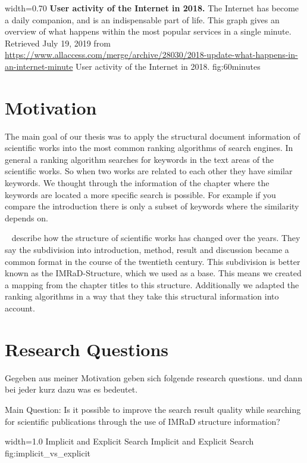       {width=0.70\textwidth}
      {\textbf{User activity of the Internet in 2018.} The Internet has become a daily companion, and is an indispensable part of life. This graph gives an overview of what happens within the most popular services in a single minute. Retrieved July 19, 2019 from \url{https://www.allaccess.com/merge/archive/28030/2018-update-what-happens-in-an-internet-minute}}
      {User activity of the Internet in 2018.}
      {fig:60minutes}

\section{Motivation}
\label{sec:Motivation}

The main goal of our thesis was to apply the structural document information of scientific works into the most common ranking algorithms of search engines. In general a ranking algorithm searches for keywords in the text areas of the scientific works. So when two works are related to each other they have similar keywords. We thought through the information of the chapter where the keywords are located a more specific search is possible. For example if you compare the introduction there is only a subset of keywords where the similarity depends on.

 ~\cite{Sollaci-The-2004} describe how the structure of scientific works has changed over the years. They say the subdivision into introduction, method, result and discussion became a common format in the course of the twentieth century. This subdivision is better known as the IMRaD-Structure, which we used as a base. This means we created a mapping from the chapter titles to this structure. Additionally we adapted the ranking algorithms in a way that they take this structural information into account.

\section{Research Questions}
\label{sec:research_questions}

Gegeben aus meiner Motivation geben sich folgende research questions. und dann bei jeder kurz dazu was es bedeutet.


Main Question: Is it possible to improve the search result quality while searching for scientific publications through the use of IMRaD structure information?

      {width=1.0\textwidth}
      {Implicit and Explicit Search}
      {Implicit and Explicit Search}
      {fig:implicit_vs_explicit}

